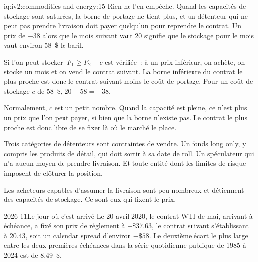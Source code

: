 \begin{solution}{iq:iv2:commodities-and-energy:15}
Rien ne l'en empêche. Quand les capacités de stockage sont saturées, la borne de portage ne tient plus, et un détenteur qui ne peut pas prendre livraison doit payer quelqu'un pour reprendre le contrat. Un prix de $-38$ alors que le mois suivant vaut 20 signifie que le stockage pour le mois vaut environ 58~\$ le baril.

Si l'on peut stocker, $F_1 \ge F_2 - c$ est vérifiée~: à un prix inférieur, on achète, on stocke un mois et on vend le contrat suivant. La borne inférieure du contrat le plus proche est donc le contrat suivant moins le coût de portage. Pour un coût de stockage $c$ de 58~\$, $20 - 58 = -38$.

Normalement, $c$ est un petit nombre. Quand la capacité est pleine, ce n'est plus un prix que l'on peut payer, si bien que la borne n'existe pas. Le contrat le plus proche est donc libre de se fixer là où le marché le place.

Trois catégories de détenteurs sont contraintes de vendre. Un fonds long only, y compris les produits de détail, qui doit sortir à sa date de roll. Un spéculateur qui n'a aucun moyen de prendre livraison. Et toute entité dont les limites de risque imposent de clôturer la position.

Les acheteurs capables d'assumer la livraison sont peu nombreux et détiennent des capacités de stockage. Ce sont eux qui fixent le prix.

\begin{dated}{2026-11}{Le jour où c'est arrivé}\label{dat:iv2:commodities-and-energy:neg-wti}
Le 20 avril 2020, le contrat WTI de mai, arrivant à échéance, a fixé son prix de règlement à $-\$37.63$, le contrat suivant s'établissant à 20.43, soit un calendar spread d'environ $-\$58$. Le deuxième écart le plus large entre les deux premières échéances dans la série quotidienne publique de 1985 à 2024 est de 8.49~\$.
\end{dated}

\end{solution}

